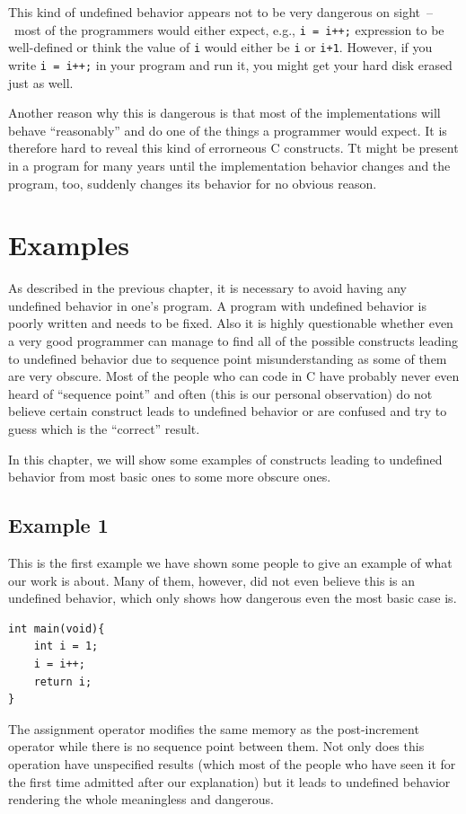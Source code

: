 This kind of undefined behavior appears not to be very dangerous on sight~--~most of the programmers would either expect, e.g., \verb|i = i++;| expression to be well-defined or think the value of \verb|i| would either be \verb|i| or \verb|i+1|.
However, if you write \verb|i = i++;| in your program and run it, you might get your hard disk erased just as well.

Another reason why this is dangerous is that most of the implementations will behave ``reasonably'' and do one of the things a programmer would expect. It is therefore hard to reveal this kind of errorneous C constructs. Tt might be present in a program for many years until the implementation behavior changes and the program, too, suddenly changes its behavior for no obvious reason.

\chapter{Examples}
As described in the previous chapter, it is necessary to avoid having any undefined behavior in one's program. A program with undefined behavior is poorly written and needs to be fixed. Also it is highly questionable whether even a very good programmer can manage to find all of the possible constructs leading to undefined behavior due to sequence point misunderstanding as some of them are very obscure. Most of the people who can code in C have probably never even heard of ``sequence point'' and often (this is our personal observation) do not believe certain construct leads to undefined behavior or are confused and try to guess which is the ``correct'' result.

In this chapter, we will show some examples of constructs leading to undefined behavior from most basic ones to some more obscure ones.

\section{Example 1}\label{example1}
This is the first example we have shown some people to give an example of what our work is about. Many of them, however, did not even believe this is an undefined behavior, which only shows how dangerous even the most basic case is.
\begin{lstlisting}
int main(void){
	int i = 1;
	i = i++;
	return i;
}
\end{lstlisting}
The assignment operator modifies the same memory as the post-increment operator while there is no sequence point between them. Not only does this operation have unspecified results (which most of the people who have seen it for the first time admitted after our explanation) but it leads to undefined behavior rendering the whole meaningless and dangerous.

